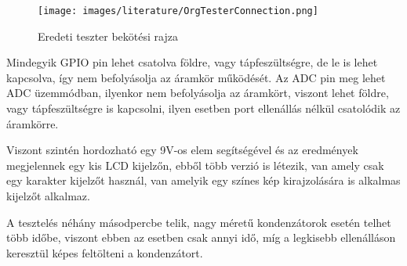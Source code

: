 \begin{figure}[h]
    \centering
    \texttt{[image: images/literature/OrgTesterConnection.png]}
    \caption{Eredeti teszter bekötési rajza}
    \label{fig:basicTesterConnection}
\end{figure}

Mindegyik GPIO pin lehet csatolva földre, vagy tápfeszültségre, de le is lehet kapcsolva, így 
nem befolyásolja az áramkör működését. Az ADC pin meg lehet ADC üzemmódban, ilyenkor nem befolyásolja
az áramkört, viszont lehet földre, vagy tápfeszültségre is kapcsolni, ilyen esetben port ellenállás
nélkül csatolódik az áramkörre.

Viszont szintén hordozható egy 9V-os elem segítségével és az eredmények megjelennek egy
kis LCD kijelzőn, ebből több verzió is létezik, van amely csak egy karakter kijelzőt
használ, van amelyik egy színes kép kirajzolására is alkalmas kijelzőt alkalmaz. 

A tesztelés néhány másodpercbe telik, nagy méretű kondenzátorok esetén telhet több időbe,
viszont ebben az esetben csak annyi idő, míg a legkisebb ellenálláson keresztül képes feltölteni
a kondenzátort.